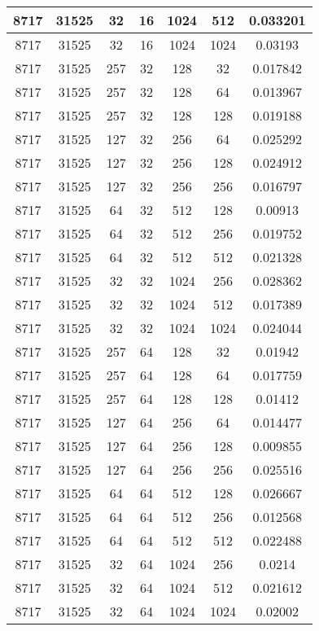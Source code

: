 \documentclass[9pt]{article}
\begin{document}
\begin{tabular}{|c|c|c|c|c|c|c| }
\hline
8717  & 31525  & 32  & 16  & 1024  & 512  & 0.033201 \\
\hline
8717  & 31525  & 32  & 16  & 1024  & 1024  & 0.03193 \\
\hline
8717  & 31525  & 257  & 32  & 128  & 32  & 0.017842 \\
\hline
8717  & 31525  & 257  & 32  & 128  & 64  & 0.013967 \\
\hline
8717  & 31525  & 257  & 32  & 128  & 128  & 0.019188 \\
\hline
8717  & 31525  & 127  & 32  & 256  & 64  & 0.025292 \\
\hline
8717  & 31525  & 127  & 32  & 256  & 128  & 0.024912 \\
\hline
8717  & 31525  & 127  & 32  & 256  & 256  & 0.016797 \\
\hline
8717  & 31525  & 64  & 32  & 512  & 128  & 0.00913 \\
\hline
8717  & 31525  & 64  & 32  & 512  & 256  & 0.019752 \\
\hline
8717  & 31525  & 64  & 32  & 512  & 512  & 0.021328 \\
\hline
8717  & 31525  & 32  & 32  & 1024  & 256  & 0.028362 \\
\hline
8717  & 31525  & 32  & 32  & 1024  & 512  & 0.017389 \\
\hline
8717  & 31525  & 32  & 32  & 1024  & 1024  & 0.024044 \\
\hline
8717  & 31525  & 257  & 64  & 128  & 32  & 0.01942 \\
\hline
8717  & 31525  & 257  & 64  & 128  & 64  & 0.017759 \\
\hline
8717  & 31525  & 257  & 64  & 128  & 128  & 0.01412 \\
\hline
8717  & 31525  & 127  & 64  & 256  & 64  & 0.014477 \\
\hline
8717  & 31525  & 127  & 64  & 256  & 128  & 0.009855 \\
\hline
8717  & 31525  & 127  & 64  & 256  & 256  & 0.025516 \\
\hline
8717  & 31525  & 64  & 64  & 512  & 128  & 0.026667 \\
\hline
8717  & 31525  & 64  & 64  & 512  & 256  & 0.012568 \\
\hline
8717  & 31525  & 64  & 64  & 512  & 512  & 0.022488 \\
\hline
8717  & 31525  & 32  & 64  & 1024  & 256  & 0.0214 \\
\hline
8717  & 31525  & 32  & 64  & 1024  & 512  & 0.021612 \\
\hline
8717  & 31525  & 32  & 64  & 1024  & 1024  & 0.02002 \\

\end{tabular}
\end{document}

